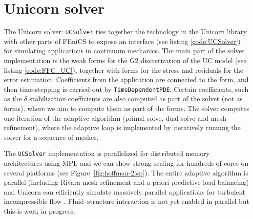 \section{Unicorn solver}

The Unicorn solver: {\tt UCSolver} ties together the technology in the
Unicorn library with other parts of FEniCS to expose an interface (see
listing \ref{code:UCSolver}) for simulating applications in continuum
mechanics. The main part of the solver implementation is the weak
forms for the G2 discretization of the UC model (see
listing \ref{code:FFC_UC}), together with forms for the stress and
residuals for the error estimation. Coefficients from the application
are connected to the form, and then time-stepping is carried out by
{\tt TimeDependentPDE}. Certain coefficients, such as the $\delta$
stabilization coefficients are also computed as part of the solver
(not as forms), where we aim to compute them as part of the forms. The
solver computes one iteration of the adaptive algorithm (primal solve,
dual solve and mesh refinement), where the adaptive loop is
implemented by iteratively running the solver for a sequence of
meshes.

The {\tt UCSolver} implementation is parallelized for distributed
memory architectures using MPI, and we can show strong scaling for
hundreds of cores on several platforms (see
Figure~\ref{fig:hoffman-2:sp}). The entire adaptive algorithm is
parallel (including Rivara mesh refinement and a priori predictive
load balancing) and Unicorn can efficiently simulate massively
parallel applications for turbulent incompressible
flow \citep{JanssonHoffmanJansson2010, Jansson2011}. Fluid--structure
interaction is not yet enabled in parallel but this is work in
progress.

